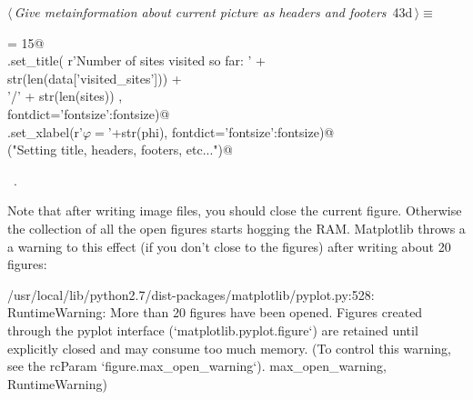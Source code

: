 \documentclass[11.5pt]{report}
\newenvironment{CVerbatim}
 {\singlespacing\center\BVerbatim}
 {\endBVerbatim\endcenter}
\begin{document}
\begin{flushleft} \small\label{scrap58}\raggedright\small
{} $\langle\,${\itshape Give metainformation about current picture as headers and footers}\nobreak\ {\footnotesize {43d}}$\,\rangle\equiv$
\vspace{-1ex}
\begin{list}{}{} \item
\mbox{}\verb@fontsize = 15@\\
\mbox{}\verb@ax.set_title( r'Number of sites visited so far: ' +\@\\
\mbox{}\verb@               str(len(data['visited_sites']))   +\@\\
\mbox{}\verb@               '/' + str(len(sites))           ,  \@\\
\mbox{}\verb@                    fontdict={'fontsize':fontsize})@\\
\mbox{}\verb@ax.set_xlabel(r'$\varphi=$'+str(phi), fontdict={'fontsize':fontsize})@\\
\mbox{}\verb@debug("Setting title, headers, footers, etc...")@\\
\mbox{}\verb@@{\NWsep}
\end{list}
\vspace{-1.5ex}
\footnotesize
\begin{list}{}{\setlength{\itemsep}{-\parsep}\setlength{\itemindent}{-\leftmargin}}
\item \NWtxtMacroRefIn\ .

\item{}
\end{list}
\vspace{4ex}
\end{flushleft}

\vspace{-0.8cm}
Note that after writing image files, you should close the current figure. Otherwise
the collection of all the open figures starts hogging the RAM. Matplotlib throws a
a warning to this effect (if you don't close to the figures) after writing about 
20 figures:

\begin{CVerbatim}[fontsize=\small]
/usr/local/lib/python2.7/dist-packages/matplotlib/pyplot.py:528: RuntimeWarning: 
More than 20 figures have been opened. Figures created through the pyplot interface 
(`matplotlib.pyplot.figure`) are retained until explicitly closed and may consume 
too much memory. (To control this warning, see the rcParam `figure.max_open_warning`).
max_open_warning, RuntimeWarning)
\end{CVerbatim}
\end{document}

